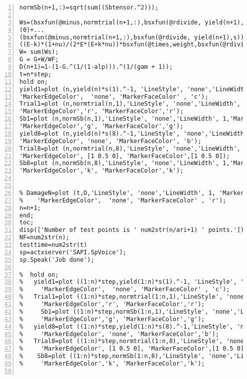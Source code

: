 \begin{lstlisting}[numbers=left, numberstyle=\tiny, keywordstyle=\color{blue!100}, commentstyle=\color{red!30!green!100!blue!100}, frame=shadowbox, rulesepcolor=\color{red!20!green!20!blue!20}]
normSb(n+1,:)=sqrt(sum((Sbtensor.^2)));

Ws=(bsxfun(@minus,normtrial(n+1,:),bsxfun(@rdivide, yield(n+1),s))<=0).*...
(0)+...
(bsxfun(@minus,normtrial(n+1,:),bsxfun(@rdivide, yield(n+1),s))>0).*...
((E-k)*(1+nu)/(2*E*(E+k*nu))*bsxfun(@times,weight,bsxfun(@rdivide,bsxfun(@times,bsxfun(@minus,normtrial(n+1,:),bsxfun(@rdivide, yield(n+1),s)),yield(n+1)),s)));
W= sum(Ws);
G = G+W/WF;
D(n+1)=1-(1-G.^(1/(1-alp))).^(1/(gam + 1));
t=n*step;
hold on;
yield1=plot (n,yield(n)*s(1).^-1, 'LineStyle', 'none','LineWidth', 1, 'Marker', 'o', 'MarkerSize', 10, ...
'MarkerEdgeColor',  'none', 'MarkerFaceColor' , 'c');
Trial1=plot (n,normtrial(n,1),'LineStyle', 'none','LineWidth', 1,'Marker', '^', 'MarkerSize', 10, ...
'MarkerEdgeColor','r', 'MarkerFaceColor','r');
Sb1=plot (n,normSb(n,1),'LineStyle', 'none','LineWidth', 1,'Marker', 'v', 'MarkerSize', 10, ...
'MarkerEdgeColor','g', 'MarkerFaceColor','g');
yield8=plot (n,yield(n)*s(8).^-1,'LineStyle', 'none','LineWidth', 1,'Marker', 'o', 'MarkerSize', 10, ...
'MarkerEdgeColor', 'none', 'MarkerFaceColor', 'b');
Trial8=plot (n,normtrial(n,8),'LineStyle', 'none','LineWidth', 1,'Marker', '^', 'MarkerSize',10, ...
'MarkerEdgeColor', [1 0.5 0], 'MarkerFaceColor',[1 0.5 0]);
Sb8=plot (n,normSb(n,8),'LineStyle', 'none','LineWidth', 1,'Marker', 'v', 'MarkerSize', 10, ...
'MarkerEdgeColor','k', 'MarkerFaceColor','k');


% DamageN=plot (t,D,'LineStyle', 'none','LineWidth', 1, 'Marker', 'o', 'MarkerSize',10, ...
%    'MarkerEdgeColor',  'none', 'MarkerFaceColor' , 'r');
n=n+1;
end;
toc;
disp(['Number of test points is ' num2str(n/ari+1) ' points.']);
NF=num2str(n);
testtime=num2str(t)
sp=actxserver('SAPI.SpVoice');
sp.Speak('Job done');

%  hold on;
%   yield1=plot ((1:n)*step,yield(1:n)*s(1).^-1, 'LineStyle', 'none','LineWidth', 1, 'Marker', 'o', 'MarkerSize', 10, ...
%     'MarkerEdgeColor',  'none', 'MarkerFaceColor' , 'c');
%   Trial1=plot ((1:n)*step,normtrial(1:n,1),'LineStyle', 'none','LineWidth', 1,'Marker', '^', 'MarkerSize',10, ...
%     'MarkerEdgeColor','r', 'MarkerFaceColor','r');
%     Sb1=plot ((1:n)*step,normSb(1:n,1),'LineStyle', 'none','LineWidth', 1,'Marker', 'v', 'MarkerSize',10, ...
%     'MarkerEdgeColor','g', 'MarkerFaceColor','g');
%   yield8=plot ((1:n)*step,yield(1:n)*s(8).^-1,'LineStyle', 'none','LineWidth', 1,'Marker', 'o', 'MarkerSize', 10, ...
%     'MarkerEdgeColor', 'none', 'MarkerFaceColor','b');
%   Trial8=plot ((1:n)*step,normtrial(1:n,8),'LineStyle', 'none','LineWidth', 1,'Marker', '^', 'MarkerSize',10, ...
%     'MarkerEdgeColor', [1 0.5 0], 'MarkerFaceColor',[1 0.5 0]);
%    Sb8=plot ((1:n)*step,normSb(1:n,8),'LineStyle', 'none','LineWidth', 1,'Marker', 'v', 'MarkerSize', 10, ...
%     'MarkerEdgeColor','k', 'MarkerFaceColor','k');


\end{lstlisting}
